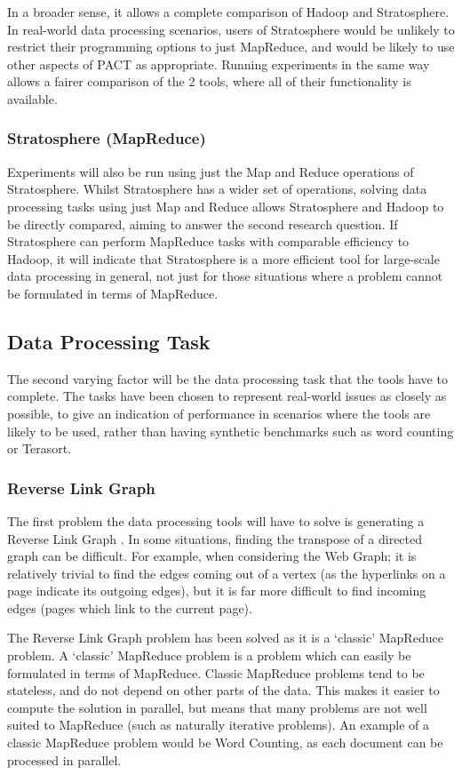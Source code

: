 In a broader sense, it allows a complete comparison of Hadoop and Stratosphere. In real-world data processing scenarios, users of Stratosphere would be unlikely to restrict their programming options to just MapReduce, and would be likely to use other aspects of PACT as appropriate. Running experiments in the same way allows a fairer comparison of the 2 tools, where all of their functionality is available.

\subsubsection{Stratosphere (MapReduce)}
Experiments will also be run using just the Map and Reduce operations of Stratosphere. Whilst Stratosphere has a wider set of operations, solving data processing tasks using just Map and Reduce allows Stratosphere and Hadoop to be directly compared, aiming to answer the second research question. If Stratosphere can perform MapReduce tasks with comparable efficiency to Hadoop, it will indicate that Stratosphere is a more efficient tool for large-scale data processing in general, not just for those situations where a problem cannot be formulated in terms of MapReduce.

\subsection{Data Processing Task}
The second varying factor will be the data processing task that the tools have to complete. The tasks have been chosen to represent real-world issues as closely as possible, to give an indication of performance in scenarios where the tools are likely to be used, rather than having synthetic benchmarks such as word counting or Terasort. 

\subsubsection{Reverse Link Graph}
The first problem the data processing tools will have to solve is generating a Reverse Link Graph \cite{dean2008mapreduce}. In some situations, finding the transpose of a directed graph can be difficult. For example, when considering the Web Graph; it is relatively trivial to find the edges coming out of a vertex (as the hyperlinks on a page indicate its outgoing edges), but it is far more difficult to find incoming edges (pages which link to the current page). 

The Reverse Link Graph problem has been solved as it is a `classic' MapReduce problem. A `classic' MapReduce problem is a problem which can easily be formulated in terms of MapReduce. Classic MapReduce problems tend to be stateless, and do not depend on other parts of the data. This makes it easier to compute the solution in parallel, but means that many problems are not well suited to MapReduce (such as naturally iterative problems). An example of a classic MapReduce problem would be Word Counting, as each document can be processed in parallel. 

